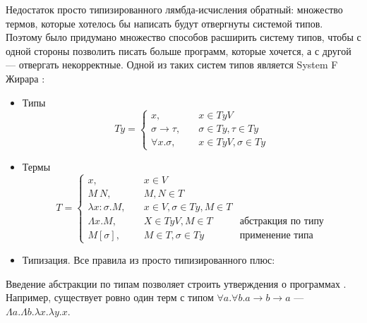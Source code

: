 Недостаток просто типизированного лямбда-исчисления обратный: множество термов,
которые хотелось бы написать будут отвергнуты системой типов. Поэтому было придумано
множество способов расширить систему типов, чтобы с одной стороны позволить писать
больше программ, которые хочется, а с другой --- отвергать некорректные. Одной из
таких систем типов является System F Жирара \cite{tapl}:
\begin{itemize}
\item Типы
   \[
   Ty = \left\{
   \begin{array}{lr}
   x,\quad& x \in TyV\\
   \sigma \rightarrow \tau,\quad& \sigma \in Ty, \tau \in Ty\\
   \forall x. \sigma,\quad& x \in TyV, \sigma \in Ty
   \end{array}
   \right.
   \]
\item Термы
   \[
   T = \left\{
   \begin{array}{lrr}
   x,\quad& x \in V&\\
   M\ N,\quad& M, N \in T&\\
   \lambda x : \sigma. M,\quad& x \in V, \sigma \in Ty, M \in T&\\
   \Lambda x. M,\quad& X \in TyV, M \in T\quad&\text{абстракция по типу}\\
   M [\sigma],\quad& M \in T, \sigma \in Ty\quad&\text{применение типа}
   \end{array}
   \right.
   \]
\item Типизация. Все правила из просто типизированного плюс:
   \begin{prooftree}
   \end{prooftree}
   \begin{prooftree}
   \end{prooftree}
\end{itemize}

Введение абстракции по типам позволяет строить утверждения о программах \cite{theorems-for-free}.
Например, существует ровно один терм с типом \(\forall a. \forall b. a \rightarrow b \rightarrow a\) ---
\(\Lambda a. \Lambda b. \lambda x. \lambda y. x\).
